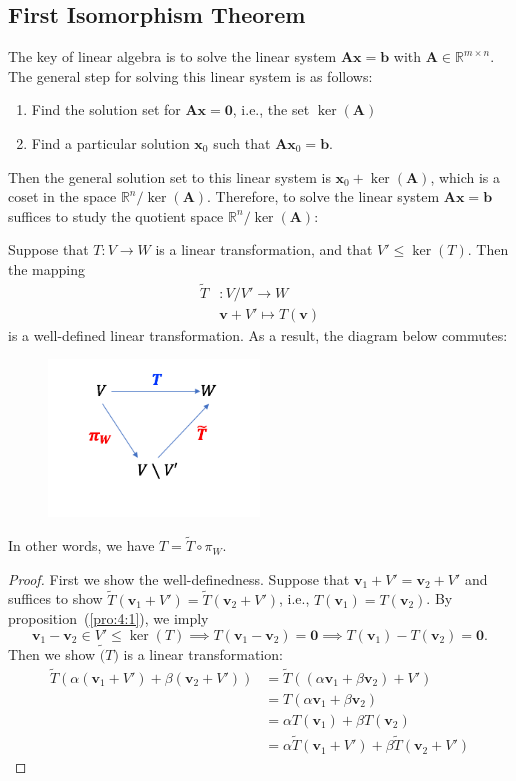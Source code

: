 \subsection{First Isomorphism Theorem}
The key of linear algebra is to solve the linear system $\bm A\bm x=\bm b$ with $\bm A\in\mathbb{R}^{m\times n}$. 
The general step for solving this linear system is as follows:
\begin{enumerate}
\item
Find the solution set for $\bm A\bm x=\bm0$, i.e., the set $\ker(\bm A)$
\item
Find a particular solution $\bm x_0$ such that $\bm A\bm x_0=\bm b$.
\end{enumerate}
Then the general solution set to this linear system is $\bm x_0+\ker(\bm A)$, which is a coset in the space $\mathbb{R}^n/ \ker(\bm A)$. Therefore, to solve the linear system $\bm{Ax}=\bm b$ suffices to study the quotient space $\mathbb{R}^n/ \ker(\bm A)$:

\begin{proposition}
Suppose that $T:V\to W$ is a linear transformation, and that $V'\le\ker(T)$. Then the mapping
\begin{align*}
\tilde{T}&:V/ V'\to W\\
&\bm v+V'\mapsto T(\bm v)
\end{align*}
is a well-defined linear transformation. As a result, the diagram below commutes:
\begin{figure}[H]
\centering
\includegraphics[width=0.5\textwidth]{week4/p_1}
\end{figure}
In other words, we have $T = \tilde{T}\circ \pi_W$.
\end{proposition}

\begin{proof}
First we show the well-definedness. Suppose that $\bm v_1+V'=\bm v_2+V'$ and suffices to show $\tilde T(\bm v_1+V')=\tilde T(\bm v_2+V')$, i.e., $T(\bm v_1)=T(\bm v_2)$. By proposition~(\ref{pro:4:1}), we imply
\[
\bm v_1-\bm v_2\in V'\le\ker(T)\implies
T(\bm v_1-\bm v_2)=\bm0\implies T(\bm v_1)-T(\bm v_2)=\bm0.
\]
Then we show $\tilde(T)$ is a linear transformation:
\begin{align*}
\tilde{T}(\alpha(\bm v_1+V')  + \beta(\bm v_2+V'))&=\tilde{T}((\alpha\bm v_1+\beta\bm v_2)+V')\\
&=T(\alpha\bm v_1+\beta\bm v_2)\\
&=\alpha T(\bm v_1)+\beta T(\bm v_2)\\
&=\alpha\tilde{T}(\bm v_1+V')+\beta\tilde{T}(\bm v_2+V')
\end{align*}
\end{proof}


